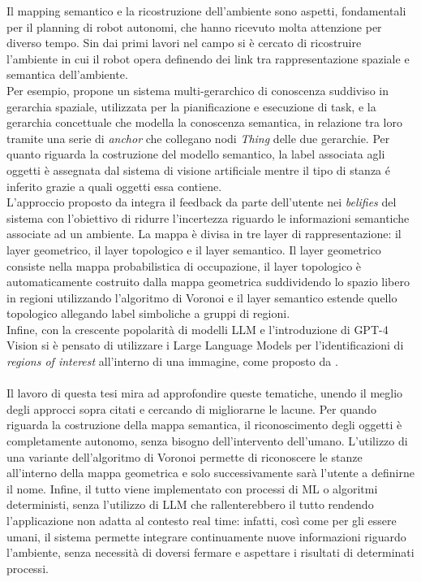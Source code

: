 Il mapping semantico e la ricostruzione dell'ambiente sono aspetti, fondamentali per il planning di robot autonomi, che hanno ricevuto molta attenzione per diverso tempo. Sin dai primi lavori nel campo si è cercato di ricostruire l'ambiente in cui il robot opera definendo dei link tra rappresentazione spaziale e semantica dell'ambiente. \\
Per esempio, \cite{galindo} propone un sistema multi-gerarchico di conoscenza suddiviso in gerarchia spaziale, %
utilizzata per la pianificazione e esecuzione di task, e la gerarchia concettuale che modella la conoscenza semantica, in relazione tra loro tramite una serie di \textit{anchor} che collegano nodi \textit{Thing} delle due gerarchie. Per quanto riguarda la costruzione del modello semantico, la label associata agli oggetti è assegnata dal sistema di visione artificiale mentre il tipo di stanza é inferito grazie a quali oggetti essa contiene.\\
L'approccio proposto da \cite{theobald_godot} integra il feedback da parte dell'utente nei \textit{belifies} del sistema con l'obiettivo di ridurre l'incertezza riguardo le informazioni semantiche associate ad un ambiente. La mappa è divisa in tre layer di rappresentazione: il layer geometrico, il layer topologico e il layer semantico. Il layer geometrico consiste nella mappa probabilistica di occupazione, il layer topologico è automaticamente costruito dalla mappa geometrica suddividendo lo spazio libero in regioni utilizzando l'algoritmo di Voronoi \cite{thrun} e il layer semantico estende quello topologico allegando label simboliche a gruppi di regioni.\\
Infine, con la crescente popolarità di modelli LLM e l'introduzione di GPT-4 Vision si è pensato di utilizzare i Large Language Models per l'identificazioni di \textit{regions of interest} all'interno di una immagine, come proposto da \cite{RunjiaTan}.\\\\
Il lavoro di questa tesi mira ad approfondire queste tematiche, unendo il meglio degli approcci sopra citati e cercando di migliorarne le lacune. Per quando riguarda la costruzione della mappa semantica, il riconoscimento degli oggetti è completamente autonomo, senza bisogno dell'intervento dell'umano. L'utilizzo di una variante dell'algoritmo di Voronoi permette di riconoscere le stanze all'interno della mappa geometrica e solo successivamente sarà l'utente a definirne il nome. Infine, il tutto viene implementato con processi di ML o algoritmi deterministi, senza l'utilizzo di LLM che rallenterebbero il tutto rendendo l'applicazione non adatta al contesto real time: infatti, così come per gli essere umani, il sistema permette integrare continuamente nuove informazioni riguardo l'ambiente, senza necessità di doversi fermare e aspettare i risultati di determinati processi.